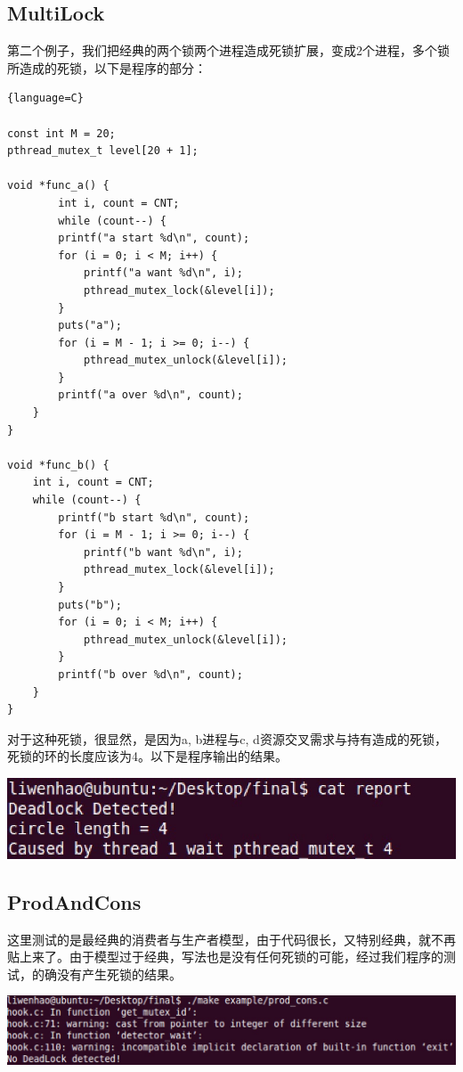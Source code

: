 \documentclass[titlepage]{article}
\begin{document}
\subsection{MultiLock}
\indent 第二个例子，我们把经典的两个锁两个进程造成死锁扩展，变成2个进程，多个锁所造成的死锁，以下是程序的部分：
\begin{lstlisting}{language=C}

const int M = 20;
pthread_mutex_t level[20 + 1];

void *func_a() {
        int i, count = CNT;
        while (count--) {
        printf("a start %d\n", count);
        for (i = 0; i < M; i++) {
            printf("a want %d\n", i);
            pthread_mutex_lock(&level[i]);
        }
        puts("a");
        for (i = M - 1; i >= 0; i--) {
            pthread_mutex_unlock(&level[i]);
        }
        printf("a over %d\n", count);
    }
}

void *func_b() {
    int i, count = CNT;
    while (count--) {
        printf("b start %d\n", count);
        for (i = M - 1; i >= 0; i--) {
            printf("b want %d\n", i);
            pthread_mutex_lock(&level[i]);
        }
        puts("b");
        for (i = 0; i < M; i++) {
            pthread_mutex_unlock(&level[i]);
        }
        printf("b over %d\n", count);
    }
}

\end{lstlisting}
\indent 对于这种死锁，很显然，是因为a, b进程与c, d资源交叉需求与持有造成的死锁，死锁的环的长度应该为4。以下是程序输出的结果。
\begin{center}
\footnotesize
\includegraphics[scale=0.4]{example2.png}
\normalsize
\end{center}

\subsection{ProdAndCons}
\indent 这里测试的是最经典的消费者与生产者模型，由于代码很长，又特别经典，就不再贴上来了。由于模型过于经典，写法也是没有任何死锁的可能，经过我们程序的测试，的确没有产生死锁的结果。
\begin{center}
	\footnotesize
	\includegraphics[scale=0.4]{example3.png}
	\normalsize
\end{center}
\end{document}
